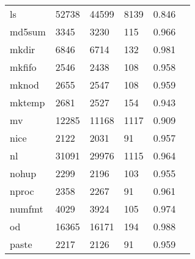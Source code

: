 \begin{longtable}{lp{2.4cm}p{2.4cm}p{2.4cm}p{2.4cm}p{2.4cm}}
ls        &                                   52738 &                       44599 &                         8139 &                                   0.846 \\
md5sum    &                                    3345 &                        3230 &                          115 &                                   0.966 \\
mkdir     &                                    6846 &                        6714 &                          132 &                                   0.981 \\
mkfifo    &                                    2546 &                        2438 &                          108 &                                   0.958 \\
mknod     &                                    2655 &                        2547 &                          108 &                                   0.959 \\
mktemp    &                                    2681 &                        2527 &                          154 &                                   0.943 \\
mv        &                                   12285 &                       11168 &                         1117 &                                   0.909 \\
nice      &                                    2122 &                        2031 &                           91 &                                   0.957 \\
nl        &                                   31091 &                       29976 &                         1115 &                                   0.964 \\
nohup     &                                    2299 &                        2196 &                          103 &                                   0.955 \\
nproc     &                                    2358 &                        2267 &                           91 &                                   0.961 \\
numfmt    &                                    4029 &                        3924 &                          105 &                                   0.974 \\
od        &                                   16365 &                       16171 &                          194 &                                   0.988 \\
paste     &                                    2217 &                        2126 &                           91 &                                   0.959 \\

\end{longtable}
